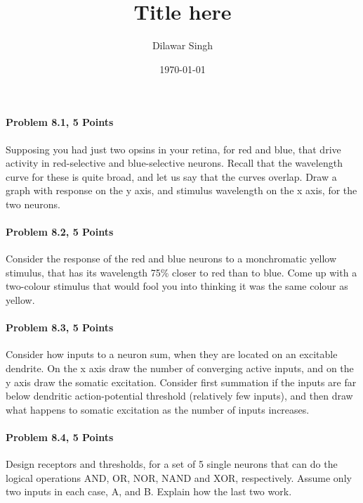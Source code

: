 \documentclass[a4paper,10pt]{article}
\title{Title here}
\author{Dilawar Singh}
\date{\today}
\begin{document}
\maketitle

\paragraph{Problem 8.1, 5 Points}

Supposing you had just two opsins in your retina, for red and blue, that drive
activity in red-selective and blue-selective neurons. Recall that the wavelength
curve for these is quite broad, and let us say that the curves overlap.  Draw a
graph with response on the y axis, and stimulus wavelength on the x axis, for
the two neurons.

\paragraph{Problem 8.2, 5 Points}
Consider the response of the red and blue neurons to a monchromatic yellow
stimulus, that has its wavelength 75\% closer to red than to blue. Come up with a
two-colour stimulus that would fool you into thinking it was the same colour as
yellow.

\paragraph{Problem 8.3, 5 Points}
Consider how inputs to a neuron sum, when they are located on an excitable
dendrite. On the x axis draw the number of converging active inputs, and on the
y axis draw the somatic excitation. Consider first summation if the inputs are
far below dendritic action-potential threshold (relatively few inputs), and then
draw what happens to somatic excitation as the number of inputs increases.

\paragraph{Problem 8.4, 5 Points}
Design receptors and thresholds, for a set of 5 single neurons that can  do the
logical operations AND, OR, NOR, NAND and XOR, respectively. Assume only two
inputs in each case, A, and B. Explain how the last two work.
\end{document}
